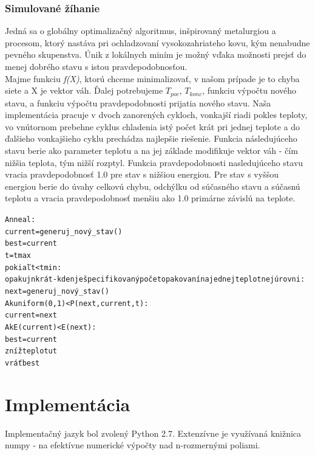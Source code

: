 \documentclass[11pt,a4paper]{article}
\begin{document}
\subsubsection{Simulované žíhanie}
Jedná sa o globálny optimalizačný algoritmus, inšpirovaný metalurgiou a procesom, ktorý nastáva pri ochladzovaní vysokozahriateho kovu, kým nenabudne pevného skupenstva. Únik z lokálnych miním je možný vďaka možnosti prejsť do menej dobrého stavu s istou pravdepodobnosťou.\\
Majme funkciu \textit{f(X)}, ktorú chceme minimalizovať, v našom prípade je to chyba siete a X je vektor váh. Ďalej potrebujeme $T_{poc}$, $T_{konc}$, funkciu výpočtu nového stavu, a funkciu výpočtu pravdepodobnosti prijatia nového stavu. Naša implementácia pracuje v dvoch zanorených cykloch, vonkajší riadi pokles teploty, vo vnútornom prebehne cyklus chladenia istý počet krát pri jednej teplote a do ďalšieho vonkajšieho cyklu prechádza najlepšie riešenie. Funkcia následujúceho stavu berie ako parameter teplotu a na jej základe modifikuje vektor váh - čím nižšia teplota, tým nižší rozptyl. Funkcia pravdepodobnosti nasledujúceho stavu vracia pravdepodobnosť 1.0 pre stav s nižšiou energiou. Pre stav s vyššou energiou berie do úvahy celkovú chybu, odchýlku od súčasného stavu a súčasnú teplotu a vracia pravdepodobnosť menšiu ako 1.0 primárne závislú na teplote.\cite{sabp}\cite{heaton}
\begin{alltt}
Anneal:
\hspace*{10mm} current = generuj_nový_stav()
\hspace*{10mm} best = current
\hspace*{10mm} t = tmax
\hspace*{10mm} pokiaľ t < tmin:
\hspace*{20mm} opakuj n krát - kde n je špecifikovaný počet opakovaní na jednej teplotnej úrovni:
\hspace*{30mm} next = generuj_nový_stav()
\hspace*{30mm} Ak uniform(0,1) < P(next, current, t):
\hspace*{40mm} current = next
\hspace*{40mm} Ak E(current) < E(next):
\hspace*{50mm} best = current
\hspace*{20mm} zníž teplotu t 
\hspace*{10mm} vráť best 
\end{alltt} 
\newpage
\section{Implementácia}
Implementačný jazyk bol zvolený Python 2.7. Extenzívne je využívaná knižnica numpy - na efektívne numerické výpočty nad n-rozmernými poliami.
\end{document}
